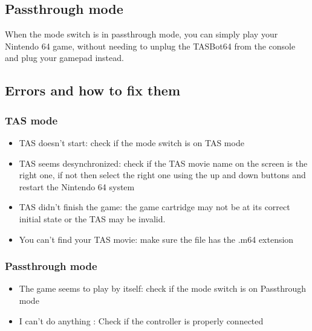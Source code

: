 \documentclass[a4paper,oneside,12pt]{article}
\begin{document}
\subsection{Passthrough mode}
When the mode switch is in passthrough mode, you can simply play your Nintendo
64 game, without needing to unplug the TASBot64 from the console and plug your
gamepad instead.

\subsection{Errors and how to fix them}
\subsubsection{TAS mode}
\begin{itemize}
\item TAS doesn't start: check if the mode switch is on TAS mode
\item TAS seems desynchronized: check if the TAS movie name on the screen is the
  right one, if not then select the right one using the up and down buttons and
  restart the Nintendo 64 system
\item TAS didn't finish the game: the game cartridge may not be at its correct
initial state or the TAS may be invalid.
\item You can't find your TAS movie: make sure the file has the .m64 extension
\end{itemize}

\subsubsection{Passthrough mode}
\begin{itemize}
\item The game seems to play by itself: check if the mode switch is on
Passthrough mode
\item I can't do anything : Check if the controller is properly connected
\end{itemize}
\end{document}
